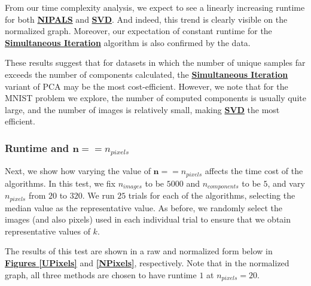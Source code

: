 \documentclass[12pt]{article}
\begin{document}
From our time complexity analysis, we expect to see a linearly increasing runtime for both \textbf{\hyperref[3.1]{NIPALS}} and \textbf{\hyperref[3.2]{SVD}}. And indeed, this trend is clearly visible on the normalized graph. Moreover, our expectation of constant runtime for the \textbf{\hyperref[3.3]{Simultaneous Iteration}} algorithm is also confirmed by the data.

These results suggest that for datasets in which the number of unique samples far exceeds the number of components calculated, the \textbf{\hyperref[3.3]{Simultaneous Iteration}} variant of PCA may be the most cost-efficient. However, we note that for the MNIST problem we explore, the number of computed components is usually quite large, and the number of images is relatively small, making \textbf{\hyperref[3.2]{SVD}} the most efficient.

\subsubsection{Runtime and $\textbf{n} == n_{pixels}$}\label{5.1.3}

Next, we show how varying the value of $\textbf{n} == n_{pixels}$ affects the time cost of the algorithms. In this test, we fix $n_{images}$ to be $5000$ and $n_{components}$ to be $5$, and vary $n_{pixels}$ from $20$ to $320$. We run $25$ trials for each of the algorithms, selecting the median value as the representative value. As before, we randomly select the images (and also pixels) used in each individual trial to ensure that we obtain representative values of $k$.

The results of this test are shown in a raw and normalized form below in \textbf{\hyperref[UPixels]{Figures \ref*{UPixels}}} and \textbf{\hyperref[NPixels]{\ref*{NPixels}}}, respectively. Note that in the normalized graph, all three methods are chosen to have runtime $1$ at $n_{pixels} = 20$.
\end{document}
